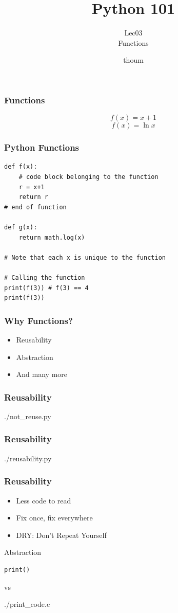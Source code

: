 \documentclass{beamer}
\title{Python 101}
\subtitle{Lec03 \\ Functions}
\author{thoum}
\begin{document}
\frame{\titlepage}

\begin{frame}
\frametitle{Functions}
  $$f(x) = x+1$$
  $$f(x) = \ln x$$
\end{frame}

\begin{frame}[fragile]
\frametitle{Python Functions}
\begin{lstlisting}
def f(x):
    # code block belonging to the function
    r = x+1
    return r
# end of function

def g(x):
    return math.log(x)

# Note that each x is unique to the function

# Calling the function
print(f(3)) # f(3) == 4
print(f(3))
\end{lstlisting}
\end{frame}
\begin{frame}
\frametitle{Why Functions?}
  \begin{itemize}
    \item Reusability
    \item Abstraction
    \item And many more
  \end{itemize}
\end{frame}

\begin{frame}
\frametitle{Reusability}
  \begin{lstinputlisting}
    {./not_reuse.py}
  \end{lstinputlisting}
\end{frame}

\begin{frame}
\frametitle{Reusability}
  \begin{lstinputlisting}
    {./reusability.py}
  \end{lstinputlisting}
\end{frame}

\begin{frame}
\frametitle{Reusability}
\begin{itemize}
  \item Less code to read
  \item Fix once, fix everywhere
  \item DRY: Don't Repeat Yourself
\end{itemize}
\end{frame}

\begin{frame}[fragile]{Abstraction}
  \begin{lstlisting}
print()
  \end{lstlisting}
  vs
  \begin{lstinputlisting}
    {./print_code.c}
  \end{lstinputlisting}
\end{frame}
\end{document}
